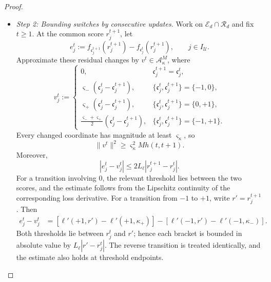 \begin{proof}
\begin{itemize}[wide]
\[
    \|P_d^{1/2}\breve X_{\mathcal U}^{\top}v\|^2
    =|\mathbf1_M^\top v|^2+\|X_{\mathcal U}^{\top}v\|^2
    \geq\sigma^2\|Q^\top U_{\mathcal U}^{\top}v\|^2,
\]
which proves \eqref{eq:configuration-switching-gaussian-bound}.
The bound holds simultaneously for every vector in the finite
set, so it also applies to vectors chosen from that set using
the observed data.

\item \emph{Step 2: Bounding switches by consecutive updates.}
Work on $\mathcal E_d\cap\mathcal R_d$ and fix $t\geq1$.
At the common score $r_j^{t+1}$, let
\[
    e_j^t:=f_{\mathfrak c_j^{t+1}}(r_j^{t+1})
             -f_{\mathfrak c_j^t}(r_j^{t+1}),
    \qquad j\in I_{\mathcal U}.
\]
Approximate these residual changes by $v^t\in\mathcal A_\kappa^M$,
where
\[
    v_j^t:=
    \begin{cases}
        0,&\mathfrak c_j^{t+1}=\mathfrak c_j^t,\\[2pt]
        \varsigma_-(\mathfrak c_j^t-\mathfrak c_j^{t+1}),
           &\{\mathfrak c_j^t,\mathfrak c_j^{t+1}\}=\{-1,0\},\\[2pt]
        \varsigma_+(\mathfrak c_j^t-\mathfrak c_j^{t+1}),
           &\{\mathfrak c_j^t,\mathfrak c_j^{t+1}\}=\{0,+1\},\\[2pt]
        \frac{\varsigma_-+\varsigma_+}{2}(\mathfrak c_j^t-\mathfrak c_j^{t+1}),
           &\{\mathfrak c_j^t,\mathfrak c_j^{t+1}\}=\{-1,+1\}.
    \end{cases}
\]
Every changed coordinate has magnitude at least $\varsigma_\kappa$,
so
\begin{equation}
    \|v^t\|^2\geq \varsigma_\kappa^2 M h(t,t+1).
    \label{eq:configuration-switching-support}
\end{equation}
Moreover,
\begin{equation}
    |e_j^t-v_j^t|\leq 2L_\ell|r_j^{t+1}-r_j^t|.
    \label{eq:configuration-switching-jump-error}
\end{equation}
For a transition involving $0$, the relevant threshold lies between
the two scores, and the estimate follows from the Lipschitz
continuity of the corresponding loss derivative.
For a transition from $-1$ to $+1$, write $r'=r_j^{t+1}$.
Then
\[
\begin{aligned}
    e_j^t-v_j^t
    &=
    [\ell'(+1,r')-\ell'(+1,\kappa_+)]
    -[\ell'(-1,r')-\ell'(-1,\kappa_-)].
\end{aligned}
\]
Both thresholds lie between $r_j^t$ and $r'$; hence each bracket
is bounded in absolute value by $L_\ell|r'-r_j^t|$.
The reverse transition is treated identically, and the estimate
also holds at threshold endpoints.


\end{itemize}
\end{proof}
